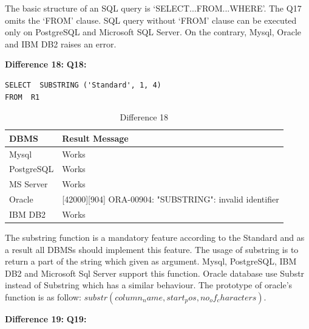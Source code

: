 The basic structure of an SQL query is ‘SELECT...FROM...WHERE’. The Q17 omits the ‘FROM’ clause. SQL query without ‘FROM’ clause can be executed only on PostgreSQL and Microsoft SQL Server. On the contrary, Mysql, Oracle and IBM DB2 raises an error. 


\hfill\newpage

\hfill\newline\textbf{Difference 18:}
\hfill\newline\textbf{Q18:}

\begin{mdframed}[backgroundcolor=lightgray!20]
\begin{lstlisting}[style=SQL]
SELECT  SUBSTRING ('Standard', 1, 4)
FROM  R1
\end{lstlisting}
\end{mdframed}

\begin{table}[h]
\centering
\caption{Difference 18}
\label{my-label}
\begin{tabular}{|p{2cm}|p{11.5cm}| }
\hline
\textbf{DBMS} & \textbf{Result Message}                                         \\ \hline
Mysql         & Works                                                           \\ \hline
PostgreSQL    & Works                                                           \\ \hline
MS Server     & Works                                                           \\ \hline
Oracle        & {[}42000{]}{[}904{]} ORA-00904: "SUBSTRING": invalid identifier \\ \hline
IBM DB2       & Works                                                           \\ \hline
\end{tabular}
\end{table}

The substring function is a mandatory feature according to the Standard and as a result all DBMSs should implement this feature. The usage of substring is to return a part of the string which given as argument. Mysql, PostgreSQL, IBM DB2 and Microsoft Sql Server support this function. Oracle database use Substr instead of Substring which has a similar behaviour. The prototype of oracle’s function is as follow: $substr (column_name, start_pos , no_of_characters).$ 


\hfill\newline\textbf{Difference 19:}
\hfill\newline\textbf{Q19:}

